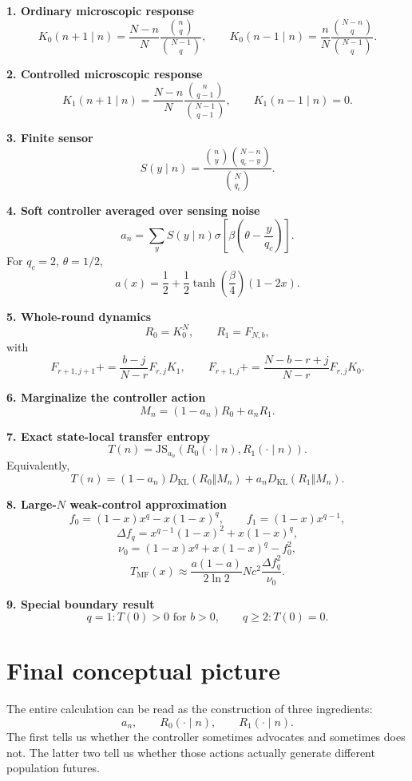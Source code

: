 \documentclass[11pt,a4paper]{article}
\newcommand{\KL}{D_{\mathrm{KL}}}
\newcommand{\JS}{\mathrm{JS}}
\newcommand{\1}{\mathbbm{1}}
\begin{document}
\begin{tcolorbox}[breakable,colback=white,colframe=deepblue,title=From model definition to exact transfer entropy,fonttitle=\bfseries]
\textbf{1. Ordinary microscopic response}
\[
K_0(n+1\mid n)=\frac{N-n}{N}\frac{\binom nq}{\binom{N-1}q},
\qquad
K_0(n-1\mid n)=\frac nN\frac{\binom{N-n}q}{\binom{N-1}q}.
\]

\textbf{2. Controlled microscopic response}
\[
K_1(n+1\mid n)=\frac{N-n}{N}\frac{\binom n{q-1}}{\binom{N-1}{q-1}},
\qquad
K_1(n-1\mid n)=0.
\]

\textbf{3. Finite sensor}
\[
S(y\mid n)=\frac{\binom ny\binom{N-n}{q_c-y}}{\binom N{q_c}}.
\]

\textbf{4. Soft controller averaged over sensing noise}
\[
a_n=\sum_yS(y\mid n)\sigma\!\left[\beta\left(\theta-\frac y{q_c}\right)\right].
\]
For $q_c=2$, $\theta=1/2$,
\[
a(x)=\frac12+\frac12\tanh\left(\frac\beta4\right)(1-2x).
\]

\textbf{5. Whole-round dynamics}
\[
R_0=K_0^N,
\qquad
R_1=F_{N,b},
\]
with
\[
F_{r+1,j+1}{+}{=}\frac{b-j}{N-r}F_{r,j}K_1,
\qquad
F_{r+1,j}{+}{=}\frac{N-b-r+j}{N-r}F_{r,j}K_0.
\]

\textbf{6. Marginalize the controller action}
\[
M_n=(1-a_n)R_0+a_nR_1.
\]

\textbf{7. Exact state-local transfer entropy}
\[
T(n)=\JS_{a_n}(R_0(\cdot\mid n),R_1(\cdot\mid n)).
\]
Equivalently,
\[
T(n)=(1-a_n)\KL(R_0\Vert M_n)+a_n\KL(R_1\Vert M_n).
\]

\textbf{8. Large-$N$ weak-control approximation}
\[
f_0=(1-x)x^q-x(1-x)^q,
\qquad
f_1=(1-x)x^{q-1},
\]
\[
\Delta f_q=x^{q-1}(1-x)^2+x(1-x)^q,
\]
\[
\nu_0=(1-x)x^q+x(1-x)^q-f_0^2,
\]
\[
\boxed{
T_{\mathrm{MF}}(x)\approx
\frac{a(1-a)}{2\ln2}
Nc^2\frac{\Delta f_q^2}{\nu_0}.}
\]

\textbf{9. Special boundary result}
\[
\boxed{q=1:T(0)>0\text{ for }b>0,
\qquad q\ge2:T(0)=0.}
\]
\end{tcolorbox}

\section{Final conceptual picture}

The entire calculation can be read as the construction of three ingredients:
\[
\boxed{a_n},\qquad
\boxed{R_0(\cdot\mid n)},\qquad
\boxed{R_1(\cdot\mid n)}.
\]
The first tells us whether the controller sometimes advocates and sometimes does not. The latter two tell us whether those actions actually generate different population futures.
\end{document}
